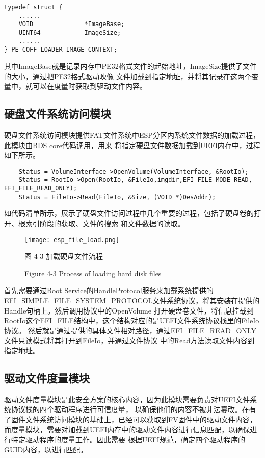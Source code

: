\begin{lstlisting}
typedef struct {
    ......
    VOID              *ImageBase;
    UINT64            ImageSize;
    ......
} PE_COFF_LOADER_IMAGE_CONTEXT;
\end{lstlisting}

其中ImageBase就是记录内存中PE32格式文件的起始地址，ImageSize提供了文件的大小，通过把PE32格式驱动映像
文件加载到指定地址，并将其记录在这两个变量中，就可以在度量时获取到驱动文件内容。

\subsection{硬盘文件系统访问模块}
硬盘文件系统访问模块提供FAT文件系统中ESP分区内系统文件数据的加载过程，此模块由BDS core代码调用，用来
将指定硬盘文件数据加载到UEFI内存中，过程如下所示。

\begin{lstlisting}
    Status = VolumeInterface->OpenVolume(VolumeInterface, &RootIo);
    Status = RootIo->Open(RootIo, &FileIo,imgdir,EFI_FILE_MODE_READ, EFI_FILE_READ_ONLY);
    Status = FileIo->Read(FileIo, &Size, (VOID *)DesAddr);
\end{lstlisting}

如代码清单所示，展示了硬盘文件访问过程中几个重要的过程，包括了硬盘卷的打开、根索引阶段的获取、文件的搜索
和文件数据的读取。

\begin{figure}[htb]
    \vspace{0cm}   
    \setlength{\abovecaptionskip}{0.3cm}
	\centering
    \texttt{[image: esp\_file\_load.png]}
    \caption*{图 4-3 加载硬盘文件流程}
    \setlength{\belowcaptionskip}{-0.7cm}
    \caption*{Figure 4-3 Process of loading hard disk files}
\end{figure}

首先需要通过Boot Service的HandleProtocol服务来加载系统提供的
EFI\_SIMPLE\_FILE\_SYSTEM\_PROTOCOL文件系统协议，将其安装在提供的Handle句柄上。然后调用协议中的OpenVolume
打开硬盘卷文件，将信息挂载到RootIo这个EFI\_FILE结构中，这个结构对应的是UEFI文件系统协议栈里的FileIo协议。
然后就是通过提供的具体文件相对路径，通过EFI\_FILE\_READ\_ONLY文件只读模式将其打开到FileIo，并通过文件协议
中的Read方法读取文件内容到指定地址。

\subsection{驱动文件度量模块}
驱动文件度量模块是此安全方案的核心内容，因为此模块需要负责对UEFI文件系统协议栈的四个驱动程序进行可信度量，
以确保他们的内容不被非法篡改。在有了固件文件系统访问模块的基础上，已经可以获取到FV固件中的驱动文件内容，
而度量模块，需要对加载到UEFI内存中的驱动文件内容进行信息匹配，以确保进行特定驱动程序的度量工作。因此需要
根据UEFI规范，确定四个驱动程序的GUID内容，以进行匹配。

